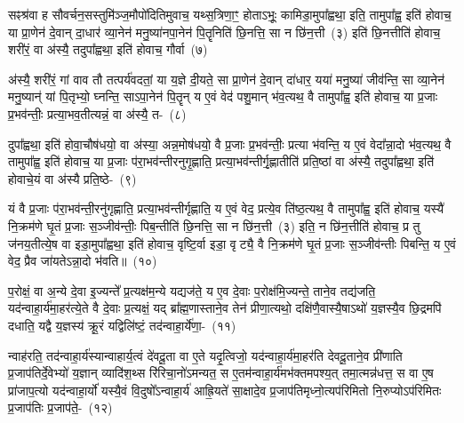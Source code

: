 {\anuvakamend[{वि॒द्वान्ध्या॑ये॒ द्यं प्रा॒श्ञन्ति॒ यां वै म॒ एका॒न्नविꣳ॑श॒तिश्च॑}]}%

सꣴश्र॑वा ह सौवर्चन॒सस्तुमि॑ञ्ज॒मौपो॑दितिमुवाच॒ यथ्स॒त्रिणा॒ꣳ॒ होता\-ऽभूः॒ कामिडा॒मुपा᳚ह्वथा॒ इति॒ तामुपा᳚ह्व॒ इति॑ होवाच॒ या प्रा॒णेन॑ दे॒वान् दा॒धार॑ व्या॒नेन॑ मनु॒ष्या॑नपा॒नेन॑ पि॒तॄनिति॑ छि॒नत्ति॒ सा न छि॑न॒त्ती~(३) इति॑ छि॒नत्तीति॑ होवाच॒ शरी॑रं॒ वा अ॑स्यै॒ तदुपा᳚ह्वथा॒ इति॑ होवाच॒ गौर्वा~(७)

अ॑स्यै॒ शरी॑रं॒ गां वाव तौ तत्पर्य॑वदतां॒ या य॒ज्ञे दी॒यते॒ सा प्रा॒णेन॑ दे॒वान् दा॑धार॒ यया॑ मनु॒ष्या॑ जीव॑न्ति॒ सा व्या॒नेन॑ मनु॒ष्यान्॑ यां पि॒तृभ्यो॒ घ्नन्ति॒ सा\-ऽपा॒नेन॑ पि॒तॄन् य ए॒वं वेद॑ पशु॒मान् भ॑व॒त्यथ॒ वै तामुपा᳚ह्व॒ इति॑ होवाच॒ या प्र॒जाः प्र॒भव॑न्तीः॒ प्रत्या॒भव॒तीत्यन्नं॒ वा अ॑स्यै॒ त-~(८)

दुपा᳚ह्वथा॒ इति॑ होवा॒चौष॑धयो॒ वा अ॑स्या॒ अन्न॒मोष॑धयो॒ वै प्र॒जाः प्र॒भव॑न्तीः॒ प्रत्या भ॑वन्ति॒ य ए॒वं वेदा᳚न्ना॒दो भ॑व॒त्यथ॒ वै तामुपा᳚ह्व॒ इति॑ होवाच॒ या प्र॒जाः प॑रा॒भव॑न्तीरनुगृ॒ह्णाति॒ प्रत्या॒भव॑न्तीर्गृ॒ह्णातीति॑ प्रति॒ष्ठां वा अ॑स्यै॒ तदुपा᳚ह्वथा॒ इति॑ होवाचे॒यं वा अ॑स्यै प्रति॒ष्ठे-~(९)

यं वै प्र॒जाः प॑रा॒भव॑न्ती॒रनु॑गृह्णाति॒ प्रत्या॒भव॑न्तीर्गृह्णाति॒ य ए॒वं वेद॒ प्रत्ये॒व ति॑ष्ठ॒त्यथ॒ वै तामुपा᳚ह्व॒ इति॑ होवाच॒ यस्यै॑ नि॒क्रम॑णे घृ॒तं प्र॒जाः स॒ञ्जीव॑न्तीः॒ पिब॒न्तीति॑ छि॒नत्ति॒ सा न छि॑न॒त्ती~(३) इति॒ न छि॑न॒त्तीति॑ होवाच॒ प्र तु ज॑नय॒तीत्ये॒ष वा इडा॒मुपा᳚ह्वथा॒ इति॑ होवाच॒ वृष्टि॒र्वा इडा॒ वृट्यै॒ वै नि॒क्रम॑णे घृ॒तं प्र॒जाः स॒ञ्जीव॑न्तीः पिबन्ति॒ य ए॒वं वेद॒ प्रैव जा॑यते\-ऽन्ना॒दो भ॑वति॥~(१०)

{\anuvakamend[{गौर्वा अ॑स्यै॒ तत् प्र॑ति॒ष्ठा\-ऽह्व॑था॒ इति॑ विꣳश॒तिश्च॑}]}%

प॒रोक्षं॒ वा अ॒न्ये दे॒वा इ॒ज्यन्ते᳚ प्र॒त्यक्ष॑म॒न्ये यद्यज॑ते॒ य ए॒व दे॒वाः प॒रोक्ष॑मि॒ज्यन्ते॒ ताने॒व तद्य॑जति॒ यद॑न्वाहा॒र्य॑मा॒हर॑त्ये॒ते वै दे॒वाः प्र॒त्यक्षं॒ यद् ब्रा᳚ह्म॒णास्ताने॒व तेन॑ प्रीणा॒त्यथो॒ दक्षि॑णै॒वास्यै॒षा\-ऽथो॑ य॒ज्ञस्यै॒व छि॒द्रमपि॑ दधाति॒ यद्वै य॒ज्ञस्य॑ क्रू॒रं यद्विलि॑ष्टं॒ तद॑न्वाहा॒र्ये॑णा॒-~(११)

न्वाह॑रति॒ तद॑न्वाहा॒र्य॑स्यान्वाहार्य॒त्वं दे॑वदू॒ता वा ए॒ते यदृ॒त्विजो॒ यद॑न्वाहा॒र्य॑मा॒हर॑ति देवदू॒ताने॒व प्री॑णाति प्र॒जा\-प॑तिर्दे॒वेभ्यो॑ य॒ज्ञान् व्यादि॑श॒थ्स रि॑रिचा॒नो॑\-ऽमन्यत॒ स ए॒तम॑न्वाहा॒र्य॑मभ॑क्तमपश्य॒त् तमा॒त्मन्न॑धत्त॒ स वा ए॒ष प्रा॑जाप॒त्यो यद॑न्वाहा॒र्यो॑ यस्यै॒वं वि॒दुषो᳚\-ऽन्वाहा॒र्य॑ आह्रि॒यते॑ सा॒क्षादे॒व प्र॒जा\-प॑तिमृध्नो॒त्यप॑रिमितो नि॒रुप्यो\-ऽप॑रिमितः प्र॒जा\-प॑तिः प्र॒जाप॑ते॒-~(१२)

